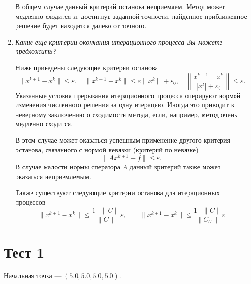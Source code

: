 \documentclass[12pt, a4paper]{article}
\begin{document}
\begin{enumerate}
		В общем случае данный критерий останова неприемлем. Метод может медленно сходится и, достигнув заданной точности, найденное приближенное решение будет находится далеко от точного.
		
		\item \textit{Какие еще критерии окончания итерационного процесса
			Вы можете предложить?}
		\smallskip
		
		Ниже приведены следующие критерии останова
		\[
		\|x^{k+1}-x^{k}\| \le \varepsilon,
		\quad 
		\|x^{k+1} - x^k\| \le \varepsilon \|x^k\| + \varepsilon_0,
		\quad
		\left\|\frac{x^{k+1} - x^k}{|x^k| + \varepsilon_0} \right\| \le \varepsilon.
		\]
		Указанные условия прерывания итерационного процесса оперируют нормой изменения численного решения за одну итерацию. Иногда это приводит к неверному заключению о сходимости метода, если, например, метод очень медленно сходится.
		
		В этом случае может оказаться успешным применение другого критерия останова, связанного с нормой невязки (критерий по невязке)
		\[
		\|A x^{k+1} - f\| \le \varepsilon.
		\]
		В случае малости нормы оператора $A$ данный критерий также может оказаться неприемлемым.
		
		Также существуют следующие критерии останова для итерационных процессов
		\[
		\|x^{k+1} - x^k\| \le \dfrac{1-\|C\|}{\|C\|} \varepsilon,
		\qquad
		\|x^{k+1} - x^k\| \le \dfrac{1-\|C\|}{\|C_U\|} \varepsilon
		\]
		

		
		
	\end{enumerate}
	\newpage
	\section{Тест 1}
	Начальная точка --- $(5.0, 5.0, 5.0, 5.0)$.
	
\end{document}
